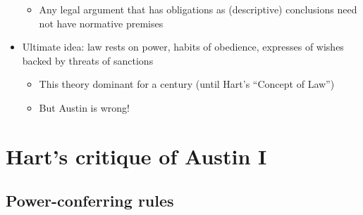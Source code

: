 \begin{itemize}
  \begin{itemize}
  \tightlist
  \item
    Any legal argument that has obligations as (descriptive) conclusions
    need not have normative premises
  \end{itemize}
\item
  Ultimate idea: law rests on power, habits of obedience, expresses of
  wishes backed by threats of sanctions

  \begin{itemize}
  \tightlist
  \item
    This theory dominant for a century (until Hart's ``Concept of Law'')
  \item
    But Austin is wrong!
  \end{itemize}
\end{itemize}

\hypertarget{harts-critique-of-austin-i}{%
\section{Hart's critique of Austin I}\label{harts-critique-of-austin-i}}

\hypertarget{power-conferring-rules}{%
\subsection{Power-conferring rules}\label{power-conferring-rules}}

